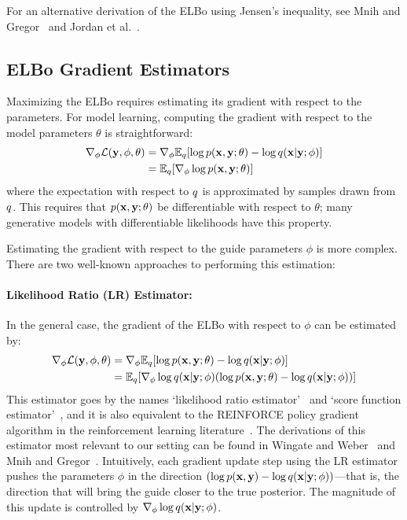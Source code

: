 For an alternative derivation of the ELBo using Jensen's inequality, see Mnih and Gregor~\cite{NVIL} and Jordan et al.~\cite[p. 213]{VariationalInference}.

\subsection{ELBo Gradient Estimators}

Maximizing the ELBo requires estimating its gradient with respect to the parameters. For model learning, computing the gradient with respect to the model parameters $\theta$ is straightforward:
\begin{align}
\begin{split}
\nabla_\phi \mathcal{L}(\mathbf{y}, \phi, \theta)
&= \nabla_\phi \mathbb{E}_{q}[ \log p(\mathbf{x}, \mathbf{y}; \theta) - \log q(\mathbf{x} | \mathbf{y} ; \phi) ]\\
&= \mathbb{E}_{q} [ \nabla_\phi \log p(\mathbf{x}, \mathbf{y}; \theta) ] 
\end{split}
\label{eq:modelParamGrad}
\end{align}
where the expectation with respect to $q$ is approximated by samples drawn from $q$. This requires that $p(\mathbf{x}, \mathbf{y}; \theta)$ be differentiable with respect to $\theta$; many generative models with differentiable likelihoods have this property.

Estimating the gradient with respect to the guide parameters $\phi$ is more complex.
There are two well-known approaches to performing this estimation:

\paragraph{Likelihood Ratio (LR) Estimator:}
In the general case, the gradient of the ELBo with respect to $\phi$ can be estimated by:
\begin{align}
\begin{split}
\nabla_\phi \mathcal{L}(\mathbf{y}, \phi, \theta)
&= \nabla_\phi \mathbb{E}_{q}[ \log p(\mathbf{x}, \mathbf{y}; \theta) - \log q(\mathbf{x} | \mathbf{y} ; \phi) ]\\
&= \mathbb{E}_{q}[ \nabla_\phi \log q(\mathbf{x} | \mathbf{y} ; \phi) ( \log p(\mathbf{x}, \mathbf{y}; \theta) - \log q(\mathbf{x} | \mathbf{y} ; \phi) ) ]
\end{split}
\label{eq:lr}
\end{align}
This estimator goes by the names `likelihood ratio estimator'~\cite{LikelihoodRatioEstimator} and `score function estimator'~\cite{ScoreFunctionEstimator}, and it is also equivalent to the REINFORCE policy gradient algorithm in the reinforcement learning literature~\cite{REINFORCE}. The derivations of this estimator most relevant to our setting can be found in Wingate and Weber~\cite{AVIPP} and Mnih and Gregor~\cite{NVIL}.
Intuitively, each gradient update step using the LR estimator pushes the parameters $\phi$ in the direction $( \log p(\mathbf{x}, \mathbf{y}) - \log q(\mathbf{x} | \mathbf{y} ; \phi) )$---that is, the direction that will bring the guide closer to the true posterior. The magnitude of this update is controlled by $\nabla_\phi \log q(\mathbf{x} | \mathbf{y} ; \phi)$.

